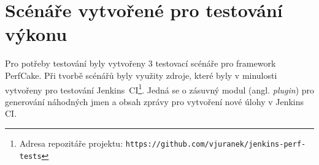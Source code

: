 \chapter{Scénáře vytvořené pro testování výkonu} \label{prilohaScenare}
    Pro potřeby testování byly vytvořeny 3 testovací scénáře pro framework PerfCake. 
    Při tvorbě scénářů byly využity zdroje, které byly v minulosti vytvořeny pro testování 
    Jenkins~CI\footnote{Adresa repozitáře projektu: 
    \texttt{https://github.com/vjuranek/jenkins-perf-tests}}.
    Jedná se o zásuvný modul (angl. \emph{plugin}) pro 
    generování náhodných jmen a obsah zprávy pro vytvoření nové úlohy v Jenkins CI. 

    \medskip

